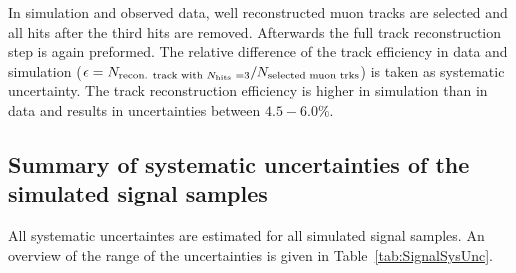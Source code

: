 In simulation and observed data, well reconstructed muon tracks are selected and all hits after the third hits are removed.
Afterwards the full track reconstruction step is again preformed.
The relative difference of the track efficiency in data and simulation ($\epsilon = N_{\text{recon. track with \nhits=3}}/N_{\text{selected muon trks}}$) is taken as systematic uncertainty.
The track reconstruction efficiency is higher in simulation than in data and results in uncertainties between $4.5-6.0\%$.\\


\subsection*{Summary of systematic uncertainties of the simulated signal samples}
All systematic uncertaintes are estimated for all simulated signal samples.
An overview of the range of the uncertainties is given in Table~\ref{tab:SignalSysUnc}.

